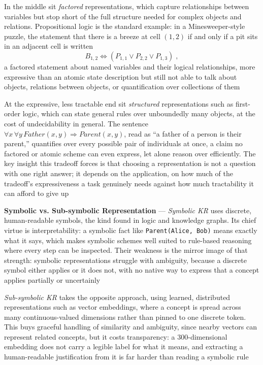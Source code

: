 In the middle sit \emph{factored} representations, which capture
relationships between variables but stop short of the full structure needed
for complex objects and relations. Propositional logic is the standard
example: in a Minesweeper-style puzzle, the statement that there is a
breeze at cell $(1,2)$ if and only if a pit sits in an adjacent cell is
written
\begin{equation}
  \label{eq:minesweeper-breeze}
  B_{1,2} \Leftrightarrow (P_{1,1} \lor P_{2,2} \lor P_{1,3})\;,
\end{equation}
a factored statement about named variables and their logical relationships,
more expressive than an atomic state description but still not able to
talk about objects, relations between objects, or quantification over
collections of them

At the expressive, less tractable end sit \emph{structured} representations
such as first-order logic, which can state general rules over unboundedly
many objects, at the cost of undecidability in general. The sentence
$\forall x \, \forall y \, Father(x, y) \Rightarrow Parent(x, y)$, read as
``a father of a person is their parent,'' quantifies over every possible
pair of individuals at once, a claim no factored or atomic scheme can even
express, let alone reason over efficiently. The key insight this tradeoff
forces is that choosing a representation is not a question with one right
answer; it depends on the application, on how much of the tradeoff's
expressiveness a task genuinely needs against how much tractability it can
afford to give up

\textbf{Symbolic vs. Sub-symbolic Representation} --- \emph{Symbolic KR} uses
discrete, human-readable symbols, the kind found in logic and knowledge
graphs. Its chief virtue is interpretability: a symbolic fact like
\texttt{Parent(Alice, Bob)} means exactly what it says, which makes symbolic
schemes well suited to rule-based reasoning where every step can be
inspected. Their weakness is the mirror image of that strength: symbolic
representations struggle with ambiguity, because a discrete symbol either
applies or it does not, with no native way to express that a concept
applies partially or uncertainly

\emph{Sub-symbolic KR} takes the opposite approach, using learned,
distributed representations such as vector embeddings, where a concept is
spread across many continuous-valued dimensions rather than pinned to one
discrete token. This buys graceful handling of similarity and ambiguity,
since nearby vectors can represent related concepts, but it costs
transparency: a 300-dimensional embedding does not carry a legible label
for what it means, and extracting a human-readable justification from it
is far harder than reading a symbolic rule

